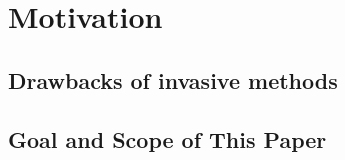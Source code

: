 
\chapter{Motivation}
\label{cha:Motivation}

\section{Drawbacks of invasive methods}
\label{sec:Drawbacks of invasive methods}

\section{Goal and Scope of This Paper}
\label{sec:Goal and Scope of This Paper}
